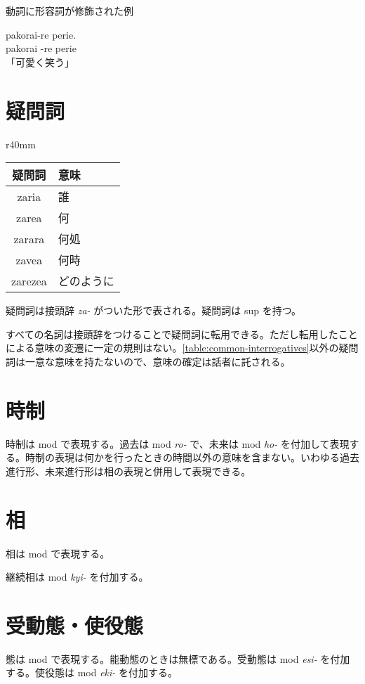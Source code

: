 \begin{itembox}[l]{動詞に形容詞が修飾された例}
    \begin{pindent}
        \noindent
        pakorai-re perie. \vspace{-1mm} \\
        pakorai -re perie \vspace{-1mm} \\
        「可愛く笑う」
    \end{pindent}
\end{itembox}

\section{疑問詞}

\begin{wraptable}[6]{r}{40mm}
    \centering
    \label{table:common-interrogatives}
    \caption{主な疑問詞}
    \begin{tabular}{cl}
        \toprule
        疑問詞 & 意味 \\
        \midrule
        zaria   & 誰 \\
        zarea   & 何 \\
        zarara  & 何処 \\
        zavea   & 何時 \\
        zarezea & どのように \\
        \bottomrule
    \end{tabular}
\end{wraptable}

疑問詞は接頭辞 \emph{za-} がついた形で表される。疑問詞は sup を持つ。

すべての名詞は接頭辞をつけることで疑問詞に転用できる。ただし転用したことによる意味の変遷に一定の規則はない。\cref{table:common-interrogatives}以外の疑問詞は一意な意味を持たないので、意味の確定は話者に託される。

\section{時制}

時制は mod で表現する。過去は mod \emph{ro-} で、未来は mod \emph{ho-} を付加して表現する。時制の表現は何かを行ったときの時間以外の意味を含まない。いわゆる過去進行形、未来進行形は相の表現と併用して表現できる。

\section{相}

相は mod で表現する。

継続相は mod \emph{kyi-} を付加する。

\section{受動態・使役態}

態は mod で表現する。能動態のときは無標である。受動態は mod \emph{esi-} を付加する。使役態は mod \emph{eki-} を付加する。